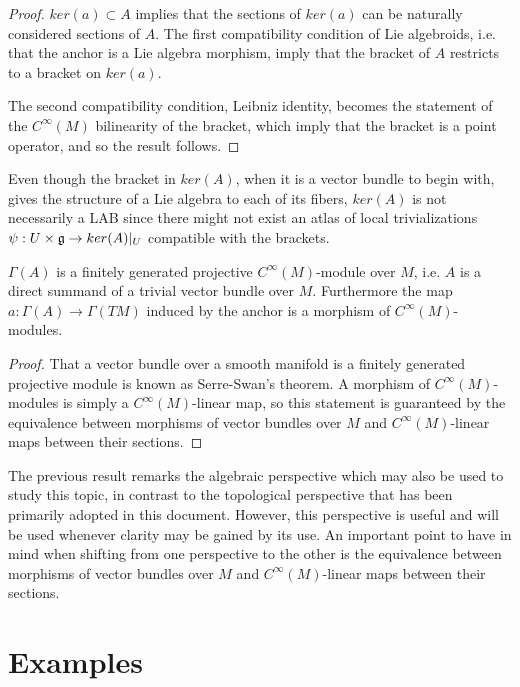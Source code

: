 \begin{proof}
$ker(a) \subset A$ implies that the sections of $ker(a)$ can be naturally considered sections of $A$. The first compatibility condition of Lie algebroids, i.e. that the anchor is a Lie algebra morphism, imply that the bracket of $A$ restricts to a bracket on $ker(a)$.

The second compatibility condition, Leibniz identity, becomes the statement of the $C^\infty(M)$ bilinearity of the bracket, which imply that the bracket is a point operator, and so the result follows.
\end{proof}

\begin{remark}
Even though the bracket in $ker(A)$, when it is a vector bundle to begin with, gives the structure of a Lie algebra to each of its fibers, $ker(A)$ is not necessarily a LAB since there might not exist an atlas of local trivializations $\psi: U \times \mathfrak{g} \to ker(A)|_U$ compatible with the brackets.
\end{remark}

\linea 

\begin{proposition}
$\Gamma(A)$ is a finitely generated projective $C^\infty(M)$-module over $M$, i.e. $A$ is a direct summand of a trivial vector bundle over $M$. Furthermore the map $a: \Gamma(A) \to \Gamma(TM)$ induced by the anchor is a morphism of $C^\infty(M)$-modules.
\end{proposition}
\begin{proof}
That a vector bundle over a smooth manifold is a finitely generated projective module is known as Serre-Swan's theorem. A morphism of $C^\infty(M)$-modules is simply a $C^\infty(M)$-linear map, so this statement is guaranteed by the equivalence between morphisms of vector bundles over $M$ and $C^\infty(M)$-linear maps between their sections.
\end{proof}

The previous result remarks the algebraic perspective which may also be used to study this topic, in contrast to the topological perspective that has been primarily adopted in this document. However, this perspective is useful and will be used whenever clarity may be gained by its use. An important point to have in mind when shifting from one perspective to the other is the equivalence between morphisms of vector bundles over $M$ and $C^\infty(M)$-linear maps between their sections.

\section{Examples}

